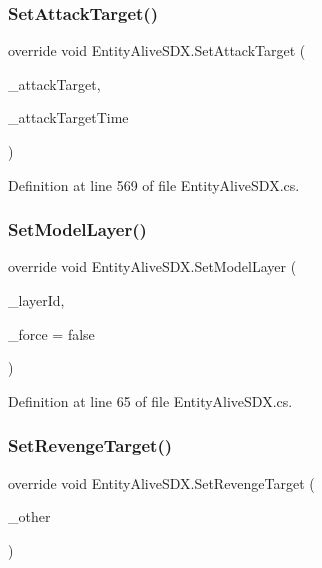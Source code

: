 \mbox{\label{class_entity_alive_s_d_x_a090c617707f4c255fc913c1161142b54}} 
\subsubsection{\texorpdfstring{SetAttackTarget()}{SetAttackTarget()}}
{\footnotesize\ttfamily override void Entity\+Alive\+S\+D\+X.\+Set\+Attack\+Target (\begin{DoxyParamCaption}\item[{Entity\+Alive}]{\+\_\+attack\+Target,  }\item[{int}]{\+\_\+attack\+Target\+Time }\end{DoxyParamCaption})}



Definition at line 569 of file Entity\+Alive\+S\+D\+X.\+cs.

\mbox{\label{class_entity_alive_s_d_x_aa99e360e366e7cde612d14fd6ca5fcce}} 
\subsubsection{\texorpdfstring{SetModelLayer()}{SetModelLayer()}}
{\footnotesize\ttfamily override void Entity\+Alive\+S\+D\+X.\+Set\+Model\+Layer (\begin{DoxyParamCaption}\item[{int}]{\+\_\+layer\+Id,  }\item[{bool}]{\+\_\+force = {\ttfamily false} }\end{DoxyParamCaption})}



Definition at line 65 of file Entity\+Alive\+S\+D\+X.\+cs.

\mbox{\label{class_entity_alive_s_d_x_a69499ec3da8165d4be0bf1242ba529da}} 
\subsubsection{\texorpdfstring{SetRevengeTarget()}{SetRevengeTarget()}}
{\footnotesize\ttfamily override void Entity\+Alive\+S\+D\+X.\+Set\+Revenge\+Target (\begin{DoxyParamCaption}\item[{Entity\+Alive}]{\+\_\+other }\end{DoxyParamCaption})}



